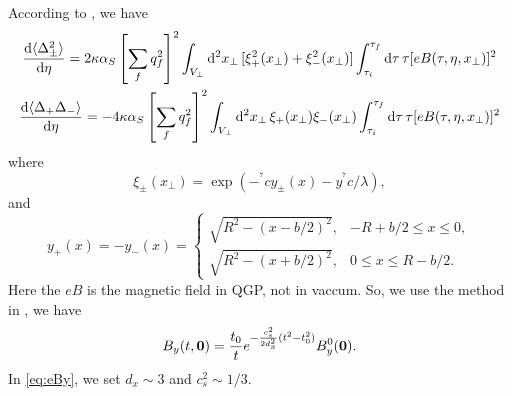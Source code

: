 \documentclass{cweb}
\begin{document}
According to \cite{Kharzeev2008}, we have
\begin{gather}
\frac{\dd{\langle \Delta_\pm^2 \rangle}}{\dd{\eta}} = 2 \kappa \alpha_S \left[ %
\sum_f q_f^2 \right]^2 \int_{V_\perp} \dd[2]{x_\perp} [\xi^2_+(x_\perp) + %
\xi^2_- (x_\perp)] \int_{\tau_i}^{\tau_f} \dd{\tau} \tau [eB(\tau, \eta, x_%
\perp)]^2 \\
\frac{\dd{\langle \Delta_+ \Delta_- \rangle}}{\dd{\eta}} = -4 \kappa \alpha_S %
\left[ \sum_f q_f^2 \right]^2 \int_{V_\perp} \dd[2]{x_\perp} \xi_+(x_\perp)%
\xi_- (x_\perp) \int_{\tau_i}^{\tau_f} \dd{\tau} \tau [eB(\tau, \eta, x_%
\perp)]^2
\end{gather}
where
\begin{equation}
\xi_\pm (x_\perp) = \exp (-^^7c y_\pm(x) - y ^^7c /  \lambda),
\end{equation}
and
\begin{equation}
y_+(x) = -y_-(x) =
\begin{cases}
\sqrt{R^2 - (x-b/2)^2}, & -R + b/2 \leq x \leq 0, \\
\sqrt{R^2 - (x+b/2)^2}, & 0 \leq x \leq R - b/2.
\end{cases}
\end{equation}
Here the $eB$ is the magnetic field in QGP, not in vaccum. So, we use the
method in \cite{Deng2012}, we have
\begin{equation}\label{eq:eBy}
B_y(t,\vb*{0}) = \frac{t_0}{t} e^{-\frac{c_s^2}{2d_x^2}(t^2 - t_0^2)} B_y^0(%
\vb*{0}).
\end{equation}
In \eqref{eq:eBy}, we set $d_x \sim 3$ and $c_s^2 \sim 1/3$.

\fi
\end{document}
